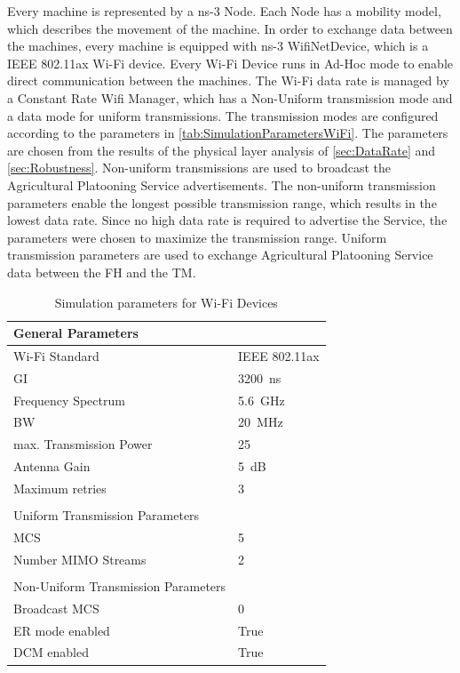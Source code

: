Every machine is represented by a ns-3 Node. Each Node has a mobility model, which describes the movement of the machine.
In order to exchange data between the machines, every machine is equipped with ns-3 WifiNetDevice, which is a IEEE 802.11ax
Wi-Fi device. Every Wi-Fi Device runs in Ad-Hoc mode to enable direct communication
between the machines. The Wi-Fi data rate is managed by a Constant Rate Wifi Manager, which has a Non-Uniform
transmission mode and a data mode for uniform transmissions.
The transmission modes are configured according
to the parameters in \autoref{tab:SimulationParametersWiFi}.
The parameters are chosen from the results of the physical layer analysis of
\autoref{sec:DataRate} and \autoref{sec:Robustness}. Non-uniform transmissions are used to broadcast the Agricultural Platooning
Service advertisements. The non-uniform transmission parameters enable the longest possible
transmission range, which results in the lowest data rate. Since no high data rate is required to advertise the Service, the parameters were
chosen to maximize the transmission range. Uniform transmission parameters are used to exchange Agricultural Platooning Service data between
the \ac{FH} and the \ac{TM}. 

\begin{table}[H]
	\centering
	\begin{tabular}{p{6cm}p{4cm}}
		General Parameters & \\
		\midrule
		Wi-Fi Standard & IEEE 802.11ax\\
		\ac{GI} & \SI{3200}{\nano\second}\\
		Frequency Spectrum & \SI{5.6}{\giga\hertz}\\
		\ac{BW} & \SI{20}{\mega\hertz}\\
		max. Transmission Power & \SI{25}{\dBm}\\
		Antenna Gain & \SI{5}{\dB}\\
		Maximum retries & \num{3}\\
		 & \\
		Uniform Transmission Parameters & \\
		\midrule
		\ac{MCS} & \num{5}\\
		Number \ac{MIMO} Streams & \num{2}\\
		 & \\
		Non-Uniform Transmission Parameters & \\
		\midrule
		Broadcast \ac{MCS} & \num{0}\\
		\ac{ER} mode enabled & True\\
		\ac{DCM} enabled & True\\
	\end{tabular}
	\caption{Simulation parameters for Wi-Fi Devices}
	\label{tab:SimulationParametersWiFi}
\end{table}

